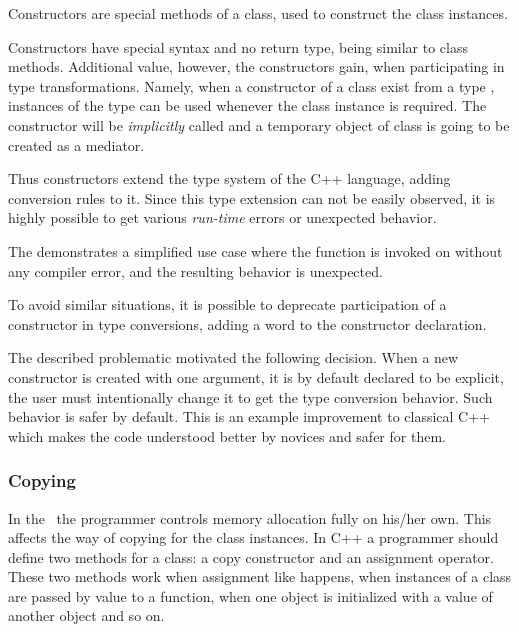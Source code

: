 \cppproblem

Constructors are special methods of a class, used to construct the class instances. 

Constructors have special syntax and no return type, being similar to class methods. Additional 
value, however, the constructors gain, when participating in type transformations. Namely, when
a constructor of a class  exist from a type , instances of the type  can be used whenever
the  class instance is required. The constructor will be \emph{implicitly} called and a temporary object
of class  is going to be created as a mediator. 

Thus constructors extend the type system of the C++ language, adding conversion rules to it. 
Since this type extension can not be easily observed, it is highly possible to get various 
\emph{run-time} errors or unexpected behavior. 


The  demonstrates a simplified use case where the function  is invoked on  without 
any compiler error, and the resulting behavior is unexpected.

To avoid similar situations, it is possible to deprecate participation 
of a constructor in type conversions, adding a word  to the constructor
declaration.

\pcppsolution

The described problematic motivated the following decision. When a new constructor is created with one argument, 
it is by default declared to be explicit, the user must intentionally change it to get the type conversion 
behavior. Such behavior is safer by default. This is an example improvement to classical C++ which makes
the code understood better by novices and safer for them.

\subsubsection{Copying}
\label{classcopying}

\cppproblem

In the \cpppl\ the programmer controls memory allocation fully on his/her own. This affects the way of copying for the class
instances.
In C++ a programmer should define two methods for a class: a copy constructor and an assignment operator.
These two methods work when assignment like  happens, when instances of a class are passed by value to a function, 
when one object is initialized with a value of another object and so on.


